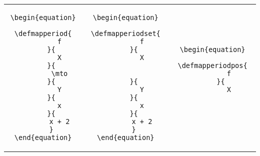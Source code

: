 \begin{widepar}
    \begin{tabular}{|c|c|c|}%
        \hline
        \begin{minipage}{0.3\textwidth}
            \begin{verbatim}
\begin{equation}
    \defmapperiod{
        f
    }{
        X
    }{
        \mto
    }{
        Y
    }{
        x
    }{
        x + 2
    }
\end{equation}
            \end{verbatim}
        \end{minipage}
         &
        \begin{minipage}{0.3\textwidth}
            \begin{verbatim}
\begin{equation}
    \defmapperiodset{
        f
    }{
        X


    }{
        Y
    }{
        x
    }{
        x + 2
    }
\end{equation}
            \end{verbatim}
        \end{minipage}
         &
        \begin{minipage}{0.3\textwidth}
            \begin{verbatim}
\begin{equation}
    \defmapperiodpos{
        f
    }{
        X



\end{verbatim}
\end{minipage}
\end{tabular}
\end{widepar}
